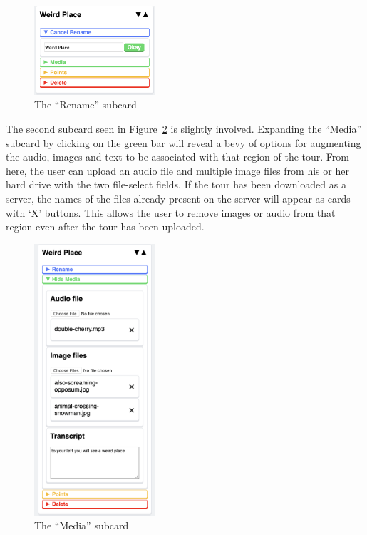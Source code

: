 \documentclass[a4paper, 10pt, american, titlepage]{article}
\begin{document}
\begin{figure}[h]
	\centering
	\includegraphics[width=0.4\textwidth]{rename-subcard-editour.png}
	\caption{The ``Rename'' subcard}
	\label{fig:renameSubcard}
\end{figure}

The second subcard seen in Figure~\ref{fig:mediaSubcard} is slightly involved.
Expanding the ``Media'' subcard by clicking on the green bar will reveal a bevy
of options for augmenting the audio, images and text to be associated with that
region of the tour. From here, the user can upload an audio file and multiple
image files from his or her hard drive with the two file-select fields. If the
tour has been downloaded as a server, the names of the files already present on
the server will appear as cards with `X' buttons. This allows the user to
remove images or audio from that region even after the tour has been uploaded.

\begin{figure}[h]
	\centering
	\includegraphics[width=0.4\textwidth]{media-subcard-editour.png}
	\caption{The ``Media'' subcard}
	\label{fig:mediaSubcard}
\end{figure}
\end{document}
